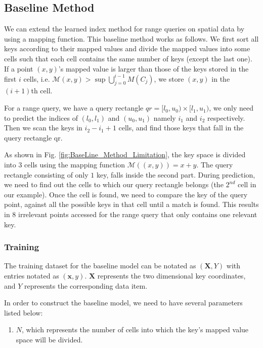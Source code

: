 \subsection{Baseline Method}  

We can extend the learned index method for range queries on spatial data by using a mapping function. This baseline method works as follows. We first sort all keys according to their mapped values and divide the mapped values into some cells such that each cell contains the same number of keys (except the last one). If a point $(x,y)$’s mapped value is larger than those of the keys stored in the first $i$ cells, i.e. $\mathcal{M}(x,y) > \sup \bigcup\limits_{j=0}^{i-1} M(C_{j})$, we store $(x,y)$ in the $(i+1)$th cell. 

For a range query, we have a query rectangle $qr = [l_{0},u_{0}) \times [l_{1},u_{1})$, we only need to predict the indices of $(l_{0}, l_{1})$ and $(u_{0},u_{1})$ namely $i_{1}$ and $i_{2}$ respectively. Then we scan the keys in $i_{2}-i_{1}+1$ cells, and find those keys that fall in the query rectangle qr. 

\begin{mscexample}
As shown in Fig. \ref{fig:BaseLine_Method_Limitation}, the key space is divided into 3 cells using the mapping function $\mathcal{M}((x,y))= x+y$. The query rectangle consisting of only $1$ key, falls inside the second part. During prediction, we need to find out the cells to which our query rectangle belongs (the $2^{nd}$ cell in our example). Once the cell is found, we need to compare the key of the query point, against all the possible keys in that cell until a match is found. This results in $8$ irrelevant points accessed for the range query that only contains one relevant key.
\end{mscexample}

\subsubsection{Training}

The training dataset for the baseline model can be notated as $(\boldsymbol{X}, Y)$ with entries notated as $(\boldsymbol{x},y)$. $\boldsymbol{X}$ represents the two dimensional key coordinates, and $Y$ represents the corresponding data item. 

In order to construct the baseline model, we need to have several parameters listed below:
\begin{enumerate}
	\item $N$, which represents the number of cells into which the key's mapped value space will be divided.
\end{enumerate}

